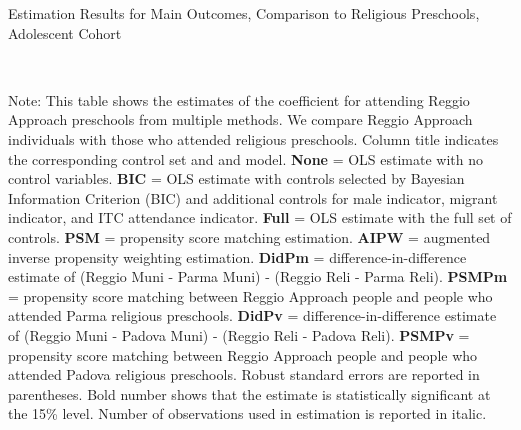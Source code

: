 \begin{table}[H] \caption{Estimation Results for Main Outcomes, Comparison to Religious Preschools, Adolescent Cohort} \label{ols-M-adol-reg-reli}
\scalebox{0.8}{}
\vspace{1ex} \\
\footnotesize\raggedright{Note: This table shows the estimates of the coefficient for attending Reggio Approach preschools from multiple methods. We compare Reggio Approach individuals with those who attended religious preschools. Column title indicates the corresponding control set and and model. \textbf{None} = OLS estimate with no control variables. \textbf{BIC} = OLS estimate with controls selected by Bayesian Information Criterion (BIC) and additional controls for male indicator, migrant indicator, and ITC attendance indicator. \textbf{Full} = OLS estimate with the full set of controls. \textbf{PSM} =  propensity score matching estimation. \textbf{AIPW} = augmented inverse propensity weighting estimation. \textbf{DidPm} = difference-in-difference estimate of (Reggio Muni - Parma Muni) - (Reggio Reli - Parma Reli). \textbf{PSMPm} = propensity score matching between Reggio Approach people and people who attended Parma religious preschools. \textbf{DidPv} = difference-in-difference estimate of (Reggio Muni - Padova Muni) - (Reggio Reli - Padova Reli). \textbf{PSMPv} = propensity score matching between Reggio Approach people and people who attended Padova religious preschools. Robust standard errors are reported in parentheses. Bold number shows that the estimate is statistically significant at the 15\% level. Number of observations used in estimation is reported in italic.}
\end{table}


